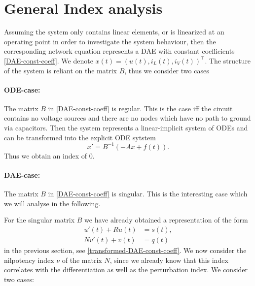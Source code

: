 \section{General Index analysis}

Assuming the system only contains linear elements, or is linearized at an operating point in order to investigate the system behaviour, then the corresponding network equation represents a DAE with constant coefficients \eqref{DAE-const-coeff}. We denote $x(t)=(u(t), i_L(t), i_V(t))^\top$. The structure of the system is reliant on the matrix $B$, thus we consider two cases

\paragraph{ODE-case:}
	The matrix $B$ in \eqref{DAE-const-coeff} is regular. This is the case iff the circuit contains no voltage sources and there are no nodes which have no path to ground via capacitors. Then the system represents a linear-implicit system of ODEs and can be transformed into the explicit ODE sytstem
	\begin{displaymath}
		x'=B^{-1}(-Ax+f(t)).
	\end{displaymath}
	Thus we obtain an index of $0$.
		
\paragraph{DAE-case:}
	The matrix $B$  in \eqref{DAE-const-coeff} is singular. This is the interesting case which we will analyse in the following.


For the singular matrix $B$ we have already obtained a representation of the form
\begin{align*}
	u'(t) + Ru(t) &= s(t), \\
	Nv'(t) + v(t) &= q(t)
\end{align*}
in the previous section, see \eqref{transformed-DAE-const-coeff}. We now consider the nilpotency index $\nu$ of the matrix $N$, since we already know that this index correlates with the differentiation as well as the perturbation index. We consider two cases:


